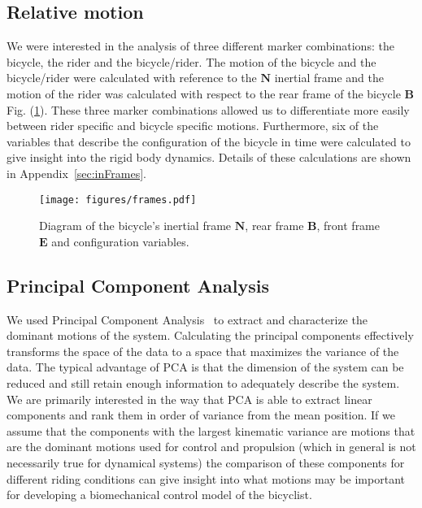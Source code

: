 \subsection{Relative motion}
\label{sec:relativeMotion}
We were interested in the analysis of three different marker combinations: the
bicycle, the rider and the bicycle/rider. The motion of the bicycle and the
bicycle/rider were calculated with reference to the $\mathbf{N}$ inertial frame
and the motion of the rider was calculated with respect to the rear frame of
the bicycle $\mathbf{B}$ Fig. (\ref{fig:frames}). These three marker
combinations allowed us to differentiate more easily between rider specific and
bicycle specific motions. Furthermore, six of the variables that describe the
configuration of the bicycle in time were calculated to give insight into the
rigid body dynamics. Details of these calculations are shown in
Appendix~\ref{sec:inFrames}.
\begin{figure}[]
    \begin{center}
        \texttt{[image: figures/frames.pdf]}
    \end{center}
    \caption{Diagram of the bicycle's inertial frame $\mathbf{N}$, rear frame $\mathbf{B}$, front frame $\mathbf{E}$ and configuration variables.}
    \label{fig:frames}
\end{figure}

\subsection{Principal Component Analysis}
\label{sec:pca}
We used Principal Component Analysis~\cite{Jolliffe2002} to extract and
characterize the dominant motions of the system. Calculating the principal
components effectively transforms the space of the data to a space that
maximizes the variance of the data. The typical advantage of PCA is that the
dimension of the system can be reduced and still retain enough information to
adequately describe the system. We are primarily interested in the way that PCA
is able to extract linear components and rank them in order of variance from
the mean position. If we assume that the components with the largest kinematic
variance are motions that are the dominant motions used for control and
propulsion (which in general is not necessarily true for dynamical systems) the
comparison of these components for different riding conditions can give insight
into what motions may be important for developing a biomechanical control model
of the bicyclist.

